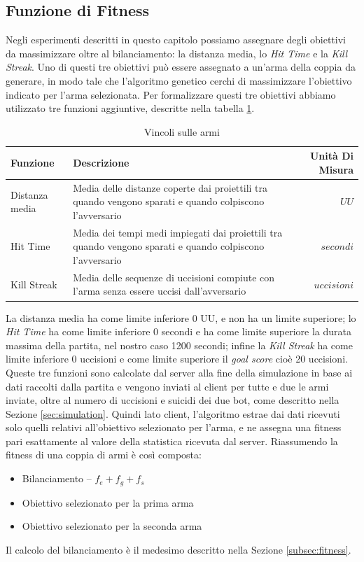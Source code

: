 \documentclass[12pt, italian]{toptesi}
\begin{document}
\subsection{Funzione di Fitness}
Negli esperimenti descritti in questo capitolo possiamo assegnare degli obiettivi da massimizzare oltre al bilanciamento: la distanza media, lo \emph{Hit Time} e la \emph{Kill Streak}.
Uno di questi tre obiettivi può essere assegnato a un'arma della coppia da generare,  in modo tale che l'algoritmo genetico cerchi di massimizzare l'obiettivo indicato per l'arma selezionata.
Per formalizzare questi tre obiettivi abbiamo utilizzato tre funzioni aggiuntive, descritte nella tabella \ref{tab:vincoli}.
\begin{table}[htp]
\caption{Vincoli sulle armi}
\label{tab:vincoli}
\centering
	\begin{tabularx}{\textwidth}{lXr}
	\toprule
	Funzione & Descrizione & Unità Di Misura\\
	\midrule
	Distanza media & Media delle distanze coperte dai proiettili tra quando vengono sparati e quando colpiscono l'avversario & $UU$\\
	\midrule
	Hit Time & Media dei tempi medi impiegati dai proiettili tra quando vengono sparati e quando colpiscono l'avversario & $secondi$ \\
	\midrule
	Kill Streak & Media delle sequenze di uccisioni compiute con l'arma senza essere uccisi dall'avversario & $uccisioni$ \\
	\bottomrule
	\end{tabularx}
\end{table}
La distanza media ha come limite inferiore 0 UU, e non ha un limite superiore; lo \emph{Hit Time} ha come limite inferiore 0 secondi e ha come limite superiore la durata massima della partita, nel nostro caso 1200 secondi;
infine la \emph{Kill Streak} ha come limite inferiore 0 uccisioni e come limite superiore il \emph{goal score} cioè 20 uccisioni.
Queste tre funzioni sono calcolate dal server alla fine della simulazione in base ai dati raccolti dalla partita e vengono inviati al client per tutte e due le armi inviate, oltre al numero di uccisioni e suicidi dei due bot, come descritto nella Sezione \ref{sec:simulation}.
Quindi lato client, l'algoritmo estrae dai dati ricevuti solo quelli relativi all'obiettivo selezionato per l'arma, e ne assegna una fitness pari esattamente al valore della statistica ricevuta dal server.
Riassumendo la fitness di una coppia di armi è così composta:
\begin{itemize}
\item Bilanciamento --  $f_e + f_g + f_s$
\item Obiettivo selezionato per la prima arma
\item Obiettivo selezionato per la seconda arma
\end{itemize}
Il calcolo del bilanciamento è il medesimo descritto nella Sezione \ref{subsec:fitness}.
\end{document}
